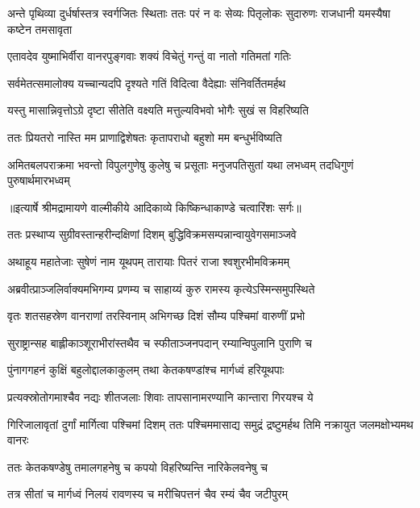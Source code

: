 \threelineshloka
{अन्ते पृथिव्या दुर्धर्षास्तत्र स्वर्गजितः स्थिताः}
{ततः परं न वः सेव्यः पितृलोकः सुदारुणः}
{राजधानी यमस्यैषा कष्टेन तमसावृता} %

\twolineshloka
{एतावदेव युष्माभिर्वीरा वानरपुङ्गवाः}
{शक्यं विचेतुं गन्तुं वा नातो गतिमतां गतिः} %

\twolineshloka
{सर्वमेतत्समालोक्य यच्चान्यदपि दृश्यते}
{गतिं विदित्वा वैदेह्याः संनिवर्तितमर्हथ} %

\twolineshloka
{यस्तु मासान्निवृत्तोऽग्रे दृष्टा सीतेति वक्ष्यति}
{मत्तुल्यविभवो भोगैः सुखं स विहरिष्यति} %

\twolineshloka
{ततः प्रियतरो नास्ति मम प्राणाद्विशेषतः}
{कृतापराधो बहुशो मम बन्धुर्भविष्यति} %

\fourlineindentedshloka
{अमितबलपराक्रमा भवन्तो}
{विपुलगुणेषु कुलेषु च प्रसूताः}
{मनुजपतिसुतां यथा लभध्वम्}
{तदधिगुणं पुरुषार्थमारभध्वम्} %


{॥इत्यार्षे श्रीमद्रामायणे वाल्मीकीये आदिकाव्ये किष्किन्धाकाण्डे चत्वारिंशः सर्गः॥}


\twolineshloka
{ततः प्रस्थाप्य सुग्रीवस्तान्हरीन्दक्षिणां दिशम्}
{बुद्धिविक्रमसम्पन्नान्वायुवेगसमाञ्जवे} %

\twolineshloka
{अथाहूय महातेजाः सुषेणं नाम यूथपम्}
{तारायाः पितरं राजा श्वशुरभीमविक्रमम्} %

\twolineshloka
{अब्रवीत्प्राञ्जलिर्वाक्यमभिगम्य प्रणम्य च}
{साहाय्यं कुरु रामस्य कृत्येऽस्मिन्समुपस्थिते} %

\twolineshloka
{वृतः शतसहस्रेण वानराणां तरस्विनाम्}
{अभिगच्छ दिशं सौम्य पश्चिमां वारुणीं प्रभो} %

\twolineshloka
{सुराष्ट्रान्सह बाह्लीकाञ्शूराभीरांस्तथैव च}
{स्फीताञ्जनपदान् रम्यान्विपुलानि पुराणि च} %

\twolineshloka
{पुंनागगहनं कुक्षिं बहुलोद्दालकाकुलम्}
{तथा केतकषण्डांश्च मार्गध्वं हरियूथपाः} %

\twolineshloka
{प्रत्यक्स्रोतोगमाश्चैव नद्यः शीतजलाः शिवाः}
{तापसानामरण्यानि कान्तारा गिरयश्च ये} %

\threelineshloka
{गिरिजालावृतां दुर्गां मार्गित्वा पश्चिमां दिशम्}
{ततः पश्चिममासाद्य समुद्रं द्रष्टुमर्हथ}
{तिमि नक्रायुत जलमक्षोभ्यमथ वानरः} %

\twolineshloka
{ततः केतकषण्डेषु तमालगहनेषु च}
{कपयो विहरिष्यन्ति नारिकेलवनेषु च} %

\twolineshloka
{तत्र सीतां च मार्गध्वं निलयं रावणस्य च}
{मरीचिपत्तनं चैव रम्यं चैव जटीपुरम्} %

